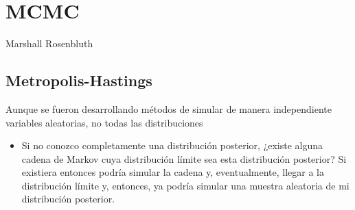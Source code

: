 \section{MCMC}

Marshall Rosenbluth

\subsection{Metropolis-Hastings}

Aunque se fueron desarrollando métodos de simular de manera independiente variables aleatorias, no todas las distribuciones 

\begin{itemize}
\item Si no conozco completamente una distribución posterior, ¿existe alguna cadena de Markov cuya distribución límite sea esta distribución posterior? Si existiera entonces podría simular la cadena y, eventualmente, llegar a la distribución límite y, entonces, ya podría simular una muestra aleatoria de mi distribución posterior.
\end{itemize}